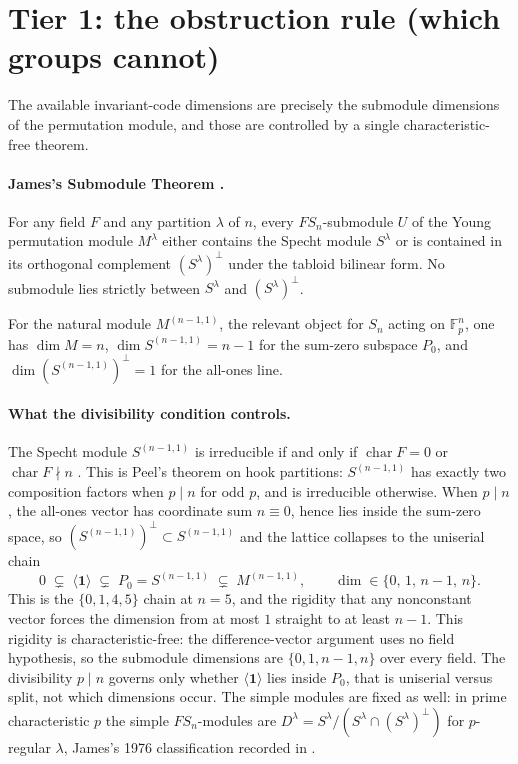 \documentclass[11pt]{article}
\newcommand{\GF}[1]{\mathbb{F}_{#1}}
\newcommand{\Sym}{S}
\newcommand{\one}{\mathbf{1}}
\begin{document}
\section{Tier 1: the obstruction rule (which groups cannot)}

The available invariant-code dimensions are precisely the submodule dimensions of the
permutation module, and those are controlled by a single characteristic-free theorem.

\paragraph{James's Submodule Theorem \cite{wildon-symnotes,tomczak-symnotes}.}
For any field $F$ and any partition $\lambda$ of $n$, every $F\Sym_n$-submodule $U$ of the
Young permutation module $M^\lambda$ either contains the Specht module $S^\lambda$ or is
contained in its orthogonal complement $(S^\lambda)^\perp$ under the tabloid bilinear
form. No submodule lies strictly between $S^\lambda$ and $(S^\lambda)^\perp$.

For the natural module $M^{(n-1,1)}$, the relevant object for $\Sym_n$ acting on
$\GF{p}^n$, one has $\dim M = n$, $\dim S^{(n-1,1)} = n-1$ for the sum-zero subspace $P_0$,
and $\dim (S^{(n-1,1)})^\perp = 1$ for the all-ones line.

\paragraph{What the divisibility condition controls.}
The Specht module $S^{(n-1,1)}$ is irreducible if and only if $\operatorname{char} F = 0$
or $\operatorname{char} F \nmid n$ \cite{wildon-symnotes}. This is Peel's theorem on hook
partitions: $S^{(n-1,1)}$ has exactly two composition factors when $p \mid n$ for odd $p$,
and is irreducible otherwise. When $p \mid n$, the all-ones vector has coordinate sum
$n \equiv 0$, hence lies inside the sum-zero space, so
$(S^{(n-1,1)})^\perp \subset S^{(n-1,1)}$ and the lattice collapses to the uniserial chain
\[
  0 \;\subsetneq\; \langle \one \rangle \;\subsetneq\; P_0 = S^{(n-1,1)}
    \;\subsetneq\; M^{(n-1,1)},
  \qquad \dim \in \{0,\,1,\,n-1,\,n\}.
\]
This is the $\{0,1,4,5\}$ chain at $n=5$, and the rigidity that any nonconstant vector
forces the dimension from at most $1$ straight to at least $n-1$. This rigidity is
characteristic-free: the difference-vector argument uses no field hypothesis, so the
submodule dimensions are $\{0,1,n-1,n\}$ over every field. The divisibility $p \mid n$
governs only whether $\langle \one\rangle$ lies inside $P_0$, that is uniserial versus
split, not which dimensions occur. The simple modules are
fixed as well: in prime characteristic $p$ the simple $F\Sym_n$-modules are
$D^\lambda = S^\lambda / (S^\lambda \cap (S^\lambda)^\perp)$ for $p$-regular $\lambda$,
James's 1976 classification recorded in \cite{wildon-symnotes}.
\end{document}
